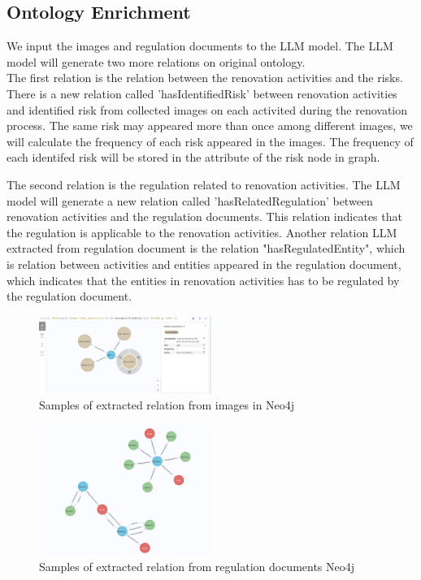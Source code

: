 \subsection*{Ontology Enrichment}
We input the images and regulation documents to the LLM model. The LLM model will generate two more relations on original ontology. \\
The first relation is the relation between the renovation activities and the risks.
 There is a new relation called 'hasIdentifiedRisk' between renovation activities and identified risk from collected images on each activited during the renovation process. 
 The same risk may appeared more than once among different images, we will calculate the frequency of each risk appeared in the images. The frequency of each identifed risk will be stored in the attribute of the risk node in graph. 
 
 The second relation is the regulation related to renovation activities. The LLM model will generate a new relation called 'hasRelatedRegulation' between renovation activities and the regulation documents.
 This relation indicates that the regulation is applicable to the renovation activities. Another relation LLM extracted from regulation document is 
 the relation "hasRegulatedEntity", which is relation between activities and entities appeared in the regulation document,
 which indicates that the entities in renovation activities has to be regulated by the regulation document.

\begin{figure}
    \centering
    \includegraphics[width=0.5\textwidth]{figures/risk identified.png}
    \caption{Samples of extracted relation from images in Neo4j}
    \label{fig:image_enrichment}
\end{figure}
\begin{figure}
    \centering
    \includegraphics[width=0.5\textwidth]{figures/regulation.png}
    \caption{Samples of extracted relation from regulation documents Neo4j}
    \label{fig:ontology_graph_enriched}
\end{figure}


